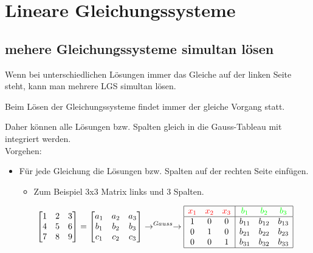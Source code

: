 \section{Lineare Gleichungssysteme}

%

\subsection{mehere Gleichungssysteme simultan lösen}
	Wenn bei unterschiedlichen Lösungen immer das Gleiche auf der linken Seite steht, kann man mehrere LGS simultan lösen.
	
	Beim Lösen der Gleichungssysteme findet immer der gleiche Vorgang statt. 
	
	Daher können alle Lösungen bzw. Spalten gleich in die Gauss-Tableau mit integriert werden.\\
	
	Vorgehen:
	\begin{itemize}
		\item Für jede Gleichung die Lösungen bzw. Spalten auf der rechten Seite einfügen.
			\begin{itemize}
				\item Zum Beispiel 3x3 Matrix links und 3 Spalten.
			\end{itemize}
		\begin{equation*}
			\begin{bmatrix} 
				1 & 2 & 3 \\ 
				4 & 5 & 6 \\ 
				7 & 8 & 9 
			\end{bmatrix} 
			= 
			\begin{bmatrix} 
				a_{1} & a_{2} & a_{3} \\ 
				b_{1} & b_{2} & b_{3} \\ 
				c_{1} & c_{2} & c_{3}
			\end{bmatrix}
			\rightarrow^{Gauss} \rightarrow
			\begin{array}{|ccc|ccc|}
				\hline
				\color{red}x_1 & \color{red}x_2 & \color{red}x_3 & \color{green} b_1 & \color{green}b_2 & \color{green}b_3 \\
				\hline
					1 & 0 & 0 & b_{11} & b_{12} & b_{13}\\
					0 & 1 & 0 & b_{21} & b_{22} & b_{23}\\
					0 & 0 & 1 & b_{31} & b_{32} & b_{33}\\
				\hline
			\end{array}
		\end{equation*}
	\end{itemize}

